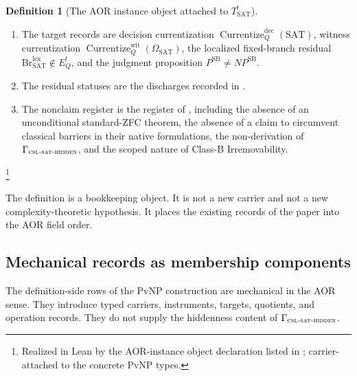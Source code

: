 \documentclass[11pt]{article}
\newcommand{\Tsat}{T^{!}_{\mathrm{SAT}}}
\newcommand{\EQbang}{E^{!}_{Q}}
\newcommand{\OmegaSAT}{\Omega_{\mathrm{SAT}}}
\newcommand{\VisBang}{\operatorname{Vis}^{!}}
\newcommand{\CurrentizeDec}{\operatorname{Currentize}^{\mathrm{dec}}_{Q}}
\newcommand{\CurrentizeWit}{\operatorname{Currentize}^{\mathrm{wit}}_{Q}}
\newcommand{\CSLSATHidden}{\Gamma_{\textsc{csl-sat-hidden}}}
\newcommand{\PSB}{P^{\mathrm{SB}}}
\newcommand{\NPSB}{NP^{\mathrm{SB}}}
\theoremstyle{definition}
\newtheorem{definition}[theorem]{Definition}
\begin{document}
\begin{definition}[The AOR instance object attached to \(\Tsat\)]
\begin{enumerate}
        relation \(\VisBang\) of .
  \item The target records are decision currentization
        \(\CurrentizeDec(\mathrm{SAT})\), witness currentization
        \(\CurrentizeWit(\OmegaSAT)\), the localized fixed-branch
        residual
        \(\mathrm{Br}^{\mathrm{lex}}_{\mathrm{SAT}}\notin\EQbang\),
        and the judgment proposition \(\PSB\neq\NPSB\).
  \item The residual statuses are the discharges recorded in
        .
  \item The nonclaim register is the register of ,
        including the absence of an unconditional standard-ZFC
        theorem, the absence of a claim to circumvent classical
        barriers in their native formulations, the non-derivation of
        \(\CSLSATHidden\), and the scoped nature of Class-B
        Irremovability.
\end{enumerate}
\footnote{Realized in Lean by the AOR-instance object declaration
listed in ; carrier-attached to the concrete
PvNP types.}
\end{definition}

The definition is a bookkeeping object.  It is not a new carrier and
not a new complexity-theoretic hypothesis.  It places the existing
records of the paper into the AOR field order.

\subsection{Mechanical records as membership components}

The definition-side rows of the PvNP construction are mechanical in
the AOR sense.  They introduce typed carriers, instruments, targets,
quotients, and operation records.  They do not supply the hiddenness
content of \(\CSLSATHidden\).
\end{document}
